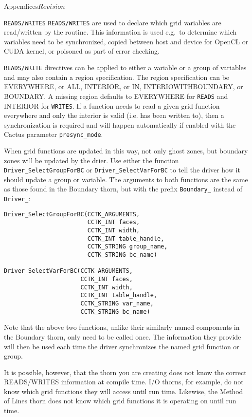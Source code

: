 \begin{cactuspart}{Appendices}{}{$Revision$}
\begin{Lentry}
\item[\texttt{READS/WRITES}] \texttt{READS/WRITES} are used to
  declare which grid variables are read/written by the routine. This information is
  used e.g.\ to determine which variables need to be synchronized, copied between host
  and device for OpenCL or CUDA kernel, or poisoned as part of error checking. 

  \texttt{READS/WRITE} directives can be applied to either a variable or a group of
  variables and may also contain a region specification. The region specification can
  be EVERYWHERE, or ALL, INTERIOR, or IN, INTERIOWITHBOUNDARY, or BOUNDARY. A
  missing region defaults to EVERYWHERE for \texttt{READS} and INTERIOR for
  \texttt{WRITES}. If a function needs to read a given grid function
  everywhere and only the interior is valid (i.e. has been written to), then a synchronization
  is required and will happen automatically if enabled with the Cactus parameter \texttt{presync\_mode}.

  When grid functions are updated in this way, not only ghost zones, but boundary zones
  will be updated by the drier.  Use either the function
  \texttt{Driver\_SelectGroupForBC} or \texttt{Driver\_SelectVarForBC} to tell the driver how it should update a group or variable. The
  arguments to both functions are the same as those found in the
  Boundary thorn, but with the prefix \texttt{Boundary\_} instead of
  \texttt{Driver\_}:

\begin{verbatim}
Driver_SelectGroupForBC(CCTK_ARGUMENTS,
                        CCTK_INT faces,
                        CCTK_INT width,
                        CCTK_INT table_handle,
                        CCTK_STRING group_name,
                        CCTK_STRING bc_name)

Driver_SelectVarForBC(CCTK_ARGUMENTS,
                      CCTK_INT faces,
                      CCTK_INT width,
                      CCTK_INT table_handle,
                      CCTK_STRING var_name,
                      CCTK_STRING bc_name)
\end{verbatim}

Note that the above two functions, unlike their similarly named components in the Boundary thorn, only need to be called once. The information they provide will then be used each time the driver synchronizes the named grid function or group.

It is possible, however, that the thorn you are creating does not know the correct READS/WRITES information at compile time. I/O thorns, for
example, do not know which grid functions they will access until run time. Likewise, the Method of Lines thorn does not know which grid functions it is operating on until run time.


\end{Lentry}
\end{cactuspart}

